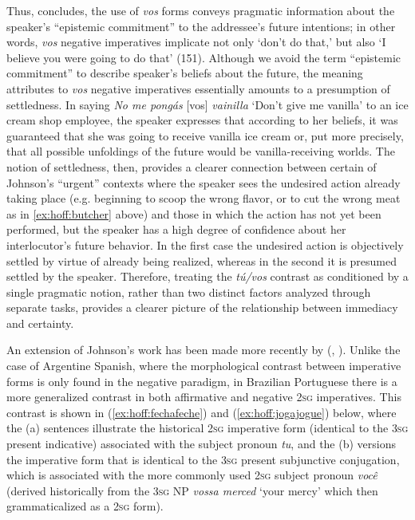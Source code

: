 \documentclass[output=paper,colorlinks,citecolor=brown]{langscibook}
\begin{document}
Thus, \citet{Johnson2013} concludes, the use of \textit{vos} forms conveys pragmatic information about the speaker’s ``epistemic commitment'' to the addressee’s future intentions; in other words, \textit{vos} negative imperatives implicate not only `don’t do that,' but also `I believe you were going to do that' (151). Although we avoid the term “epistemic commitment” to describe speaker’s beliefs about the future, the meaning \citet{Johnson2013} attributes to \textit{vos} negative imperatives essentially amounts to a presumption of settledness. In saying \textit{No me pong\'{a}s} [vos] \textit{vainilla} `Don’t give me vanilla' to an ice cream shop employee, the speaker expresses that according to her beliefs, it was guaranteed that she was going to receive vanilla ice cream or, put more precisely, that all possible unfoldings of the future would be vanilla-receiving worlds. The notion of settledness, then, provides a clearer connection between certain of Johnson’s ``urgent'' contexts where the speaker sees the undesired action already taking place (e.g. beginning to scoop the wrong flavor, or to cut the wrong meat as in \ref{ex:hoff:butcher} above) and those in which the action has not yet been performed, but the speaker has a high degree of confidence about her interlocutor’s future behavior. In the first case the undesired action is objectively settled by virtue of already being realized, whereas in the second it is presumed settled by the speaker. Therefore, treating the \textit{t\'{u}/vos} contrast as conditioned by a single pragmatic notion, rather than two distinct factors analyzed through separate tasks, provides a clearer picture of the relationship between immediacy and certainty.

An extension of Johnson’s work has been made more recently by \citeauthor{LambertiSchwenter2015} (\citeyear{LambertiSchwenter2015}, \citeyear{LambertiSchwenter2018}). Unlike the case of Argentine Spanish, where the morphological contrast between imperative forms is only found in the negative paradigm, in Brazilian Portuguese there is a more generalized contrast in both affirmative and negative \textsc{2sg} imperatives. This contrast is shown in (\ref{ex:hoff:fechafeche}) and (\ref{ex:hoff:jogajogue}) below, where the (a) sentences illustrate the historical \textsc{2sg} imperative form (identical to the \textsc{3sg} present indicative) associated with the subject pronoun \textit{tu}, and the (b) versions the imperative form that is identical to the \textsc{3sg} present subjunctive conjugation, which is associated with the more commonly used \textsc{2sg} subject pronoun \textit{você} (derived historically from the \textsc{3sg} NP \textit{vossa merced} ‘your mercy’ which then grammaticalized as a \textsc{2sg} form).
\end{document}
